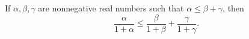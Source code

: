 If $\alpha, \beta, \gamma$ are nonnegative real numbers such that $\alpha \leq \beta + \gamma$, then
$$\frac{\alpha}{1 + \alpha} \leq \frac{\beta}{1 + \beta} + \frac{\gamma}{1 + \gamma}.$$
